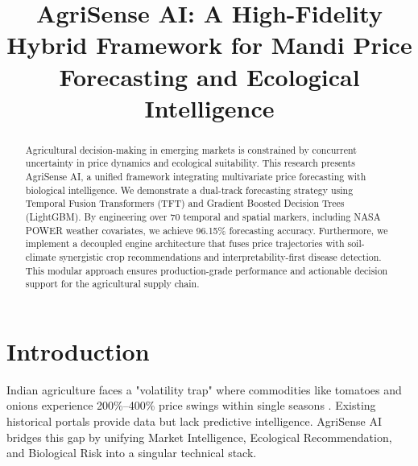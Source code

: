 \documentclass[conference]{IEEEtran}
\begin{document}
\title{AgriSense AI: A High-Fidelity Hybrid Framework for Mandi Price Forecasting and Ecological Intelligence}

\author{
\and
{}
}

\maketitle

\begin{abstract}
Agricultural decision-making in emerging markets is constrained by concurrent uncertainty in price dynamics and ecological suitability. This research presents AgriSense AI, a unified framework integrating multivariate price forecasting with biological intelligence. We demonstrate a dual-track forecasting strategy using Temporal Fusion Transformers (TFT) and Gradient Boosted Decision Trees (LightGBM). By engineering over 70 temporal and spatial markers, including NASA POWER weather covariates, we achieve 96.15\% forecasting accuracy. Furthermore, we implement a decoupled engine architecture that fuses price trajectories with soil-climate synergistic crop recommendations and interpretability-first disease detection. This modular approach ensures production-grade performance and actionable decision support for the agricultural supply chain.
\end{abstract}

\section{Introduction}
Indian agriculture faces a "volatility trap" where commodities like tomatoes and onions experience 200\%--400\% price swings within single seasons \cite{nitiaayog2019}. Existing historical portals provide data but lack predictive intelligence. AgriSense AI bridges this gap by unifying Market Intelligence, Ecological Recommendation, and Biological Risk into a singular technical stack.
\end{document}
